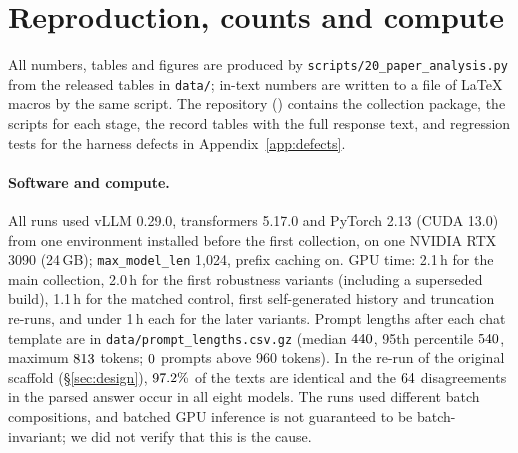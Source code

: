 \section{Reproduction, counts and compute}
\label{app:repro}

All numbers, tables and figures are produced by
\texttt{scripts/20\_paper\_analysis.py} from the released tables in
\texttt{data/}; in-text numbers are written to a file of \LaTeX{} macros by the
same script. The repository (\repourl) contains the collection package, the
scripts for each stage, the record tables with the full response text, and
regression tests for the harness defects in Appendix~\ref{app:defects}.

\begin{table}[h]
\centering\small\setlength{\tabcolsep}{4pt}

\caption{Generation counts by collection arm (identical for the eight
models). The pressure and shared reference arms form the $\nMain$ main
records. Both builds of the self-generated history are counted; only the
validated build is analysed. The re-runs cover $\nTruncRerunMain$ main-arm
and $\nTruncRerunRob$ robustness-arm truncated non-answers.}
\label{tab:manifest}
\end{table}

\begin{table}[h]
\centering\small

\caption{Hugging Face checkpoints and revisions used. Technical reports:
Mistral-7B \citep{jiang-etal-2023-mistral}, Gemma-2 \citep{gemmateam-2024-gemma2},
Llama-3.1 \citep{grattafiori-etal-2024-llama3}, Qwen2.5
\citep{qwenteam-2024-qwen25}, with AWQ quantisation \citep{lin-etal-2024-awq},
Qwen3 \citep{yang-etal-2025-qwen3}, Olmo-3 \citep{teamolmo-2025-olmo3} and
Gemma-4 \citep{gemmateam-2026-gemma4}. Gemma-4-E4B has 4.5B
effective parameters and about 8B including embeddings, according to its
model card \citep{google-2026-gemma4}.}
\label{tab:checkpoints}
\end{table}

\paragraph{Software and compute.} All runs used vLLM 0.29.0, transformers
5.17.0 and PyTorch 2.13 (CUDA 13.0) from one environment installed before the
first collection, on one NVIDIA RTX 3090 (24\,GB); \texttt{max\_model\_len}
1{,}024, prefix caching on. GPU time: 2.1\,h for the main collection, 2.0\,h
for the first robustness variants (including a superseded build), 1.1\,h for
the matched control, first self-generated history and truncation re-runs,
and under 1\,h each for the later variants. Prompt lengths after each chat
template are in \texttt{data/prompt\_lengths.csv.gz} (median $440$,
95th percentile $540$, maximum $813$ tokens; $0$
prompts above 960 tokens). In the re-run of the original scaffold
(\S\ref{sec:design}), $97.2\%$ of the texts are identical and the
$64$ disagreements in the parsed answer occur in all eight models.
The runs used different batch compositions, and batched GPU inference is not
guaranteed to be batch-invariant; we did not verify that this is the cause.

